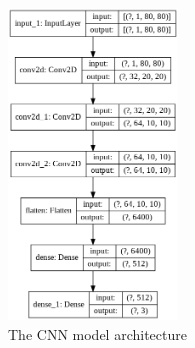 \documentclass[12p]{article}
\begin{document}
    \begin{figure}
      \vspace{10pt}
      \captionsetup{justification=centering, margin=5pt}
      \begin{center}
      \includegraphics[width=0.4\textwidth]{model}
      \end{center}
      \vspace*{-5mm}
      \caption{The CNN model architecture}
    \end{figure}
\end{document}
